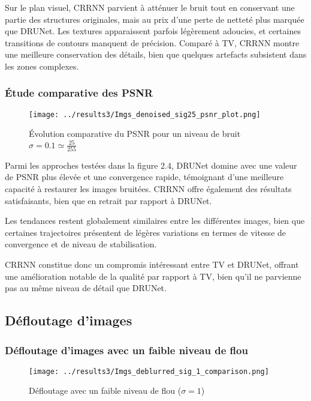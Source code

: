 \documentclass[a4paper, 12pt]{report} %
\begin{document}
Sur le plan visuel, CRRNN parvient à atténuer le bruit tout en conservant une partie des structures originales, mais au prix d’une perte de netteté plus marquée que DRUNet. Les textures apparaissent parfois légèrement adoucies, et certaines transitions de contours manquent de précision. Comparé à TV, CRRNN montre une meilleure conservation des détails, bien que quelques artefacts subsistent dans les zones complexes.

\subsubsection{Étude comparative des PSNR}

\begin{figure}[H]
\centering
\begin{adjustbox}{width=0.985\linewidth, totalheight=0.47 \textheight, angle=0, scale=0.9, minipage=4.2\linewidth, margin=0}
    \texttt{[image: ../results3/Imgs\_denoised\_sig25\_psnr\_plot.png]}
\end{adjustbox}
    \caption{Évolution comparative du PSNR pour un niveau de bruit  $\sigma = 0.1 \simeq \frac{25}{255}$}
    \label{fig:15}
\end{figure}

Parmi les approches testées dans la figure 2.4, DRUNet domine avec une valeur de PSNR plus élevée et une convergence rapide, témoignant d'une meilleure capacité à restaurer les images bruitées. CRRNN offre également des résultats satisfaisants, bien que en retrait par rapport à DRUNet.

Les tendances restent globalement similaires entre les différentes images, bien que certaines trajectoires présentent de légères variations en termes de vitesse de convergence et de niveau de stabilisation.

CRRNN constitue donc un compromis intéressant entre TV et DRUNet, offrant une amélioration notable de la qualité par rapport à TV, bien qu’il ne parvienne pas au même niveau de détail que DRUNet.

\subsection{Défloutage d'images}
\subsubsection{Défloutage d'images avec un faible niveau de flou }
\begin{figure}[H]
\centering
\begin{adjustbox}{width=1.1 \linewidth, totalheight=0.47 \textheight, angle=0, scale= 0.85, minipage= 4.2\linewidth, margin= 0}
    \texttt{[image: ../results3/Imgs\_deblurred\_sig\_1\_comparison.png]}
\end{adjustbox}
    \caption{Défloutage avec un faible niveau de flou (\(\sigma = 1\))}
    \label{fig:16}
\end{figure}
\end{document}
